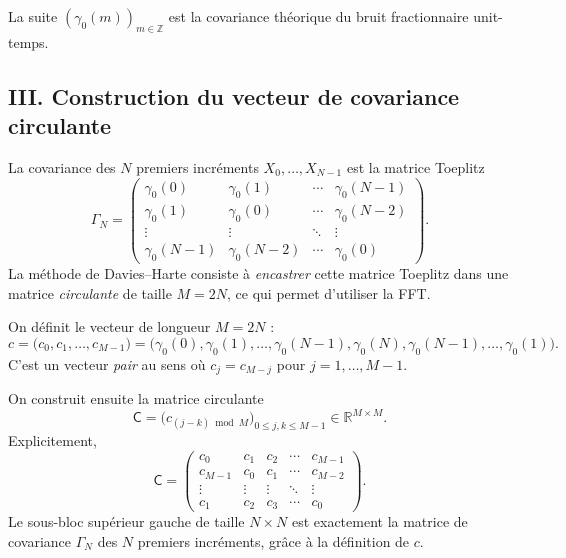 \documentclass[11pt,a4paper]{article}
\newcommand{\R}{\mathbb{R}}
\newcommand{\1}{\mathbf{1}}
\begin{document}
La suite $(\gamma_0(m))_{m\in\mathbb{Z}}$ est la covariance
théorique du bruit fractionnaire unit-temps.

\subsection*{III. Construction du vecteur de covariance circulante}

La covariance des $N$ premiers incréments $X_0,\dots,X_{N-1}$
est la matrice Toeplitz
\begin{equation}
  \Gamma_N =
  \begin{pmatrix}
    \gamma_0(0)   & \gamma_0(1)   & \cdots & \gamma_0(N-1) \\
    \gamma_0(1)   & \gamma_0(0)   & \cdots & \gamma_0(N-2) \\
    \vdots        & \vdots        & \ddots & \vdots        \\
    \gamma_0(N-1) & \gamma_0(N-2) & \cdots & \gamma_0(0)
  \end{pmatrix}.
\end{equation}
La méthode de Davies--Harte consiste à \emph{encastrer} cette
matrice Toeplitz dans une matrice \emph{circulante} de taille
$M=2N$, ce qui permet d'utiliser la FFT.

On définit le vecteur de longueur $M=2N$ :
\begin{equation}
  c =
  \bigl(
  c_0,c_1,\dots,c_{M-1}
  \bigr)
  =
  \bigl(
    \gamma_0(0),\gamma_0(1),\dots,
    \gamma_0(N-1),\gamma_0(N),\gamma_0(N-1),\dots,\gamma_0(1)
  \bigr).
\end{equation}
C'est un vecteur \emph{pair} au sens où $c_j=c_{M-j}$ pour
$j=1,\dots,M-1$.

On construit ensuite la matrice circulante
\begin{equation}
  \mathsf{C} =
  \bigl(c_{(j-k)\bmod M}\bigr)_{0\le j,k\le M-1}
  \in\R^{M\times M}.
\end{equation}
Explicitement,
\[
  \mathsf{C} =
  \begin{pmatrix}
    c_0   & c_1   & c_2   & \cdots & c_{M-1} \\
    c_{M-1} & c_0 & c_1   & \cdots & c_{M-2} \\
    \vdots  & \vdots & \vdots & \ddots & \vdots \\
    c_1  & c_2  & c_3  & \cdots & c_0
  \end{pmatrix}.
\]
Le sous-bloc supérieur gauche de taille $N\times N$ est
exactement la matrice de covariance $\Gamma_N$ des $N$
premiers incréments, grâce à la définition de $c$.
\end{document}
